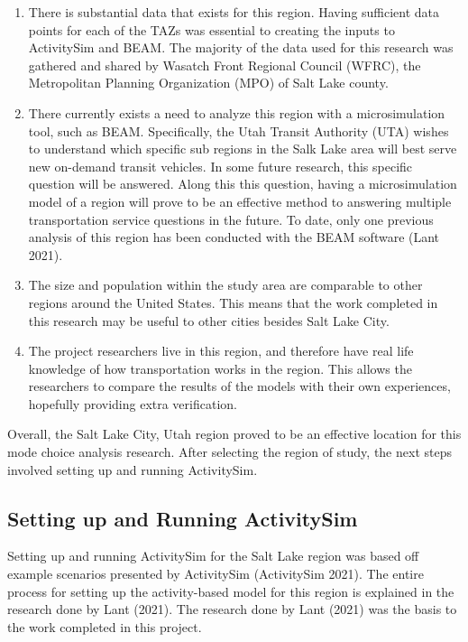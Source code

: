 \documentclass[12pt, oneside, openright]{byuthesis}
\providecommand{\tightlist}{%
  \setlength{\itemsep}{0pt}\setlength{\parskip}{0pt}}
\begin{document}
\begin{enumerate}
\def\labelenumi{\arabic{enumi}.}
\tightlist
\item
  There is substantial data that exists for this region. Having sufficient data points for each of the TAZs was essential to creating the inputs to ActivitySim and BEAM. The majority of the data used for this research was gathered and shared by Wasatch Front Regional Council (WFRC), the Metropolitan Planning Organization (MPO) of Salt Lake county.
\item
  There currently exists a need to analyze this region with a microsimulation tool, such as BEAM. Specifically, the Utah Transit Authority (UTA) wishes to understand which specific sub regions in the Salk Lake area will best serve new on-demand transit vehicles. In some future research, this specific question will be answered. Along this this question, having a microsimulation model of a region will prove to be an effective method to answering multiple transportation service questions in the future. To date, only one previous analysis of this region has been conducted with the BEAM software (Lant 2021).
\item
  The size and population within the study area are comparable to other regions around the United States. This means that the work completed in this research may be useful to other cities besides Salt Lake City.
\item
  The project researchers live in this region, and therefore have real life knowledge of how transportation works in the region. This allows the researchers to compare the results of the models with their own experiences, hopefully providing extra verification.
\end{enumerate}

Overall, the Salt Lake City, Utah region proved to be an effective location for this mode choice analysis research. After selecting the region of study, the next steps involved setting up and running ActivitySim.

\hypertarget{setting-up-and-running-activitysim}{%
\subsection{Setting up and Running ActivitySim}\label{setting-up-and-running-activitysim}}

Setting up and running ActivitySim for the Salt Lake region was based off example scenarios presented by ActivitySim (ActivitySim 2021). The entire process for setting up the activity-based model for this region is explained in the research done by Lant (2021). The research done by Lant (2021) was the basis to the work completed in this project.
\end{document}
